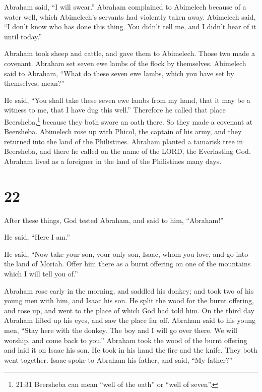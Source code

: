  Abraham said, ``I will swear.''  Abraham
complained to Abimelech because of a water well, which Abimelech's
servants had violently taken away.  Abimelech said, ``I
don't know who has done this thing. You didn't tell me, and I didn't
hear of it until today.''

 Abraham took sheep and cattle, and gave them to Abimelech.
Those two made a covenant.  Abraham set seven ewe lambs of
the flock by themselves.  Abimelech said to Abraham, ``What
do these seven ewe lambs, which you have set by themselves, mean?''

 He said, ``You shall take these seven ewe lambs from my
hand, that it may be a witness to me, that I have dug this well.''
 Therefore he called that place Beersheba,\footnote{21:31
  Beersheba can mean ``well of the oath'' or ``well of seven''.} because
they both swore an oath there.  So they made a covenant at
Beersheba. Abimelech rose up with Phicol, the captain of his army, and
they returned into the land of the Philistines.  Abraham
planted a tamarisk tree in Beersheba, and there he called on the name of
the LORD, the Everlasting God.  Abraham lived as a
foreigner in the land of the Philistines many days.

\hypertarget{section-21}{%
\section{22}\label{section-21}}

 After these things, God tested Abraham, and said to him,
``Abraham!''

He said, ``Here I am.''

 He said, ``Now take your son, your only son, Isaac, whom
you love, and go into the land of Moriah. Offer him there as a burnt
offering on one of the mountains which I will tell you of.''

 Abraham rose early in the morning, and saddled his donkey;
and took two of his young men with him, and Isaac his son. He split the
wood for the burnt offering, and rose up, and went to the place of which
God had told him.  On the third day Abraham lifted up his
eyes, and saw the place far off.  Abraham said to his young
men, ``Stay here with the donkey. The boy and I will go over there. We
will worship, and come back to you.''  Abraham took the wood
of the burnt offering and laid it on Isaac his son. He took in his hand
the fire and the knife. They both went together.  Isaac
spoke to Abraham his father, and said, ``My father?''

